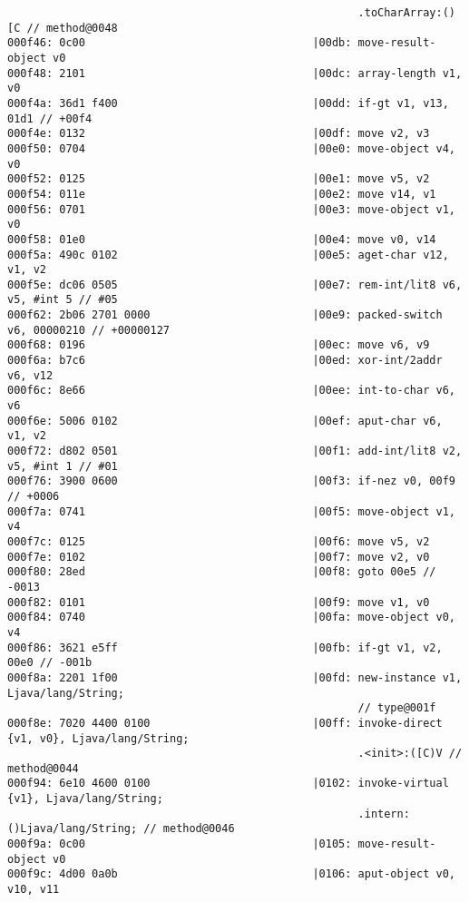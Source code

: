 \begin{lstlisting}
                                                      .toCharArray:()[C // method@0048
000f46: 0c00                                   |00db: move-result-object v0
000f48: 2101                                   |00dc: array-length v1, v0
000f4a: 36d1 f400                              |00dd: if-gt v1, v13, 01d1 // +00f4
000f4e: 0132                                   |00df: move v2, v3
000f50: 0704                                   |00e0: move-object v4, v0
000f52: 0125                                   |00e1: move v5, v2
000f54: 011e                                   |00e2: move v14, v1
000f56: 0701                                   |00e3: move-object v1, v0
000f58: 01e0                                   |00e4: move v0, v14
000f5a: 490c 0102                              |00e5: aget-char v12, v1, v2
000f5e: dc06 0505                              |00e7: rem-int/lit8 v6, v5, #int 5 // #05
000f62: 2b06 2701 0000                         |00e9: packed-switch v6, 00000210 // +00000127
000f68: 0196                                   |00ec: move v6, v9
000f6a: b7c6                                   |00ed: xor-int/2addr v6, v12
000f6c: 8e66                                   |00ee: int-to-char v6, v6
000f6e: 5006 0102                              |00ef: aput-char v6, v1, v2
000f72: d802 0501                              |00f1: add-int/lit8 v2, v5, #int 1 // #01
000f76: 3900 0600                              |00f3: if-nez v0, 00f9 // +0006
000f7a: 0741                                   |00f5: move-object v1, v4
000f7c: 0125                                   |00f6: move v5, v2
000f7e: 0102                                   |00f7: move v2, v0
000f80: 28ed                                   |00f8: goto 00e5 // -0013
000f82: 0101                                   |00f9: move v1, v0
000f84: 0740                                   |00fa: move-object v0, v4
000f86: 3621 e5ff                              |00fb: if-gt v1, v2, 00e0 // -001b
000f8a: 2201 1f00                              |00fd: new-instance v1, Ljava/lang/String;
                                                      // type@001f
000f8e: 7020 4400 0100                         |00ff: invoke-direct {v1, v0}, Ljava/lang/String;
                                                      .<init>:([C)V // method@0044
000f94: 6e10 4600 0100                         |0102: invoke-virtual {v1}, Ljava/lang/String;
                                                      .intern:()Ljava/lang/String; // method@0046
000f9a: 0c00                                   |0105: move-result-object v0
000f9c: 4d00 0a0b                              |0106: aput-object v0, v10, v11

\end{lstlisting}

